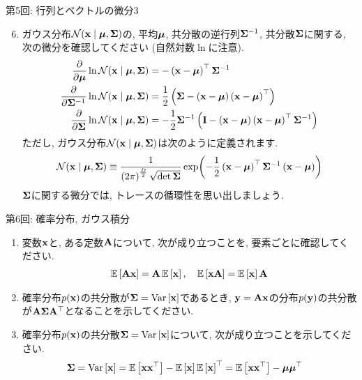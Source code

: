 \documentclass[dvipdfmx,notheorems,t]{beamer}
\begin{document}
\begin{frame}{第5回: 行列とベクトルの微分3}
\begin{enumerate}
  \setcounter{enumi}{5}
  \item ガウス分布$\mathcal{N}(\vb{x} \mid \vb*{\mu}, \vb{\Sigma})$の,
  平均$\vb*{\mu}$, 共分散の逆行列$\vb{\Sigma}^{-1}$, 共分散$\vb{\Sigma}$に関する,
  次の微分を確認してください (自然対数$\ln$に注意).
  \begin{align*}
    \pdv{\vb*{\mu}} \ln \mathcal{N}(\vb{x} \mid \vb*{\mu}, \vb{\Sigma})
    &= -\left( \vb{x} - \vb*{\mu} \right)^\top \vb{\Sigma}^{-1} \\
    \pdv{\vb{\Sigma}^{-1}} \ln \mathcal{N}(\vb{x} \mid \vb*{\mu}, \vb{\Sigma})
    &= \frac{1}{2} \left( \vb{\Sigma}
      - \left( \vb{x} - \vb*{\mu} \right) \left( \vb{x} - \vb*{\mu} \right)^\top \right) \\
    \pdv{\vb{\Sigma}} \ln \mathcal{N}(\vb{x} \mid \vb*{\mu}, \vb{\Sigma})
    &= -\frac{1}{2} \vb{\Sigma}^{-1} \left( \vb{I}
      - \left( \vb{x} - \vb*{\mu} \right) \left( \vb{x} - \vb*{\mu} \right)^\top
      \vb{\Sigma}^{-1} \right)
  \end{align*}
  ただし, ガウス分布$\mathcal{N}(\vb{x} \mid \vb*{\mu}, \vb{\Sigma})$は次のように定義されます.
  \begin{align*}
    \mathcal{N}(\vb{x} \mid \vb*{\mu}, \vb{\Sigma})
      \equiv \frac{1}{\left( 2\pi \right)^\frac{D}{2} \sqrt{\det \vb{\Sigma}}}
      \exp(-\frac{1}{2} \left( \vb{x} - \vb*{\mu} \right)^\top \vb{\Sigma}^{-1}
        \left( \vb{x} - \vb*{\mu} \right))
  \end{align*}
  $\vb{\Sigma}$に関する微分では, トレースの循環性を思い出しましょう.
\end{enumerate}
\end{frame}

\begin{frame}{第6回: 確率分布, ガウス積分}
\begin{enumerate}
  \item 変数$\vb{x}$と, ある定数$\vb{A}$について, 次が成り立つことを, 要素ごとに確認してください.
  \begin{align*}
    \operatorname{\mathbb{E}} \left[ \vb{A} \vb{x} \right] = \vb{A} \operatorname{\mathbb{E}} \left[ \vb{x} \right], \quad
    \operatorname{\mathbb{E}} \left[ \vb{x} \vb{A} \right] = \operatorname{\mathbb{E}} \left[ \vb{x} \right] \vb{A}
  \end{align*}

  \item 確率分布$p(\vb{x})$の共分散が$\vb{\Sigma} = \operatorname{Var} \left[ \vb{x} \right]$であるとき,
  $\vb{y} = \vb{A} \vb{x}$の分布$p(\vb{y})$の共分散が$\vb{A} \vb{\Sigma} \vb{A}^\top$となることを示してください.

  \item 確率分布$p(\vb{x})$の共分散$\vb{\Sigma} = \operatorname{Var} \left[ \vb{x} \right]$について, 次が成り立つことを示してください.
  \begin{align*}
    \vb{\Sigma} &= \operatorname{Var} \left[ \vb{x} \right] = \operatorname{\mathbb{E}} \left[ \vb{x} \vb{x}^\top \right] - \operatorname{\mathbb{E}} \left[ \vb{x} \right] \operatorname{\mathbb{E}} \left[ \vb{x} \right]^\top
      = \operatorname{\mathbb{E}} \left[ \vb{x} \vb{x}^\top \right] - \vb*{\mu} \vb*{\mu}^\top
  \end{align*}
\end{enumerate}
\end{frame}
\end{document}
